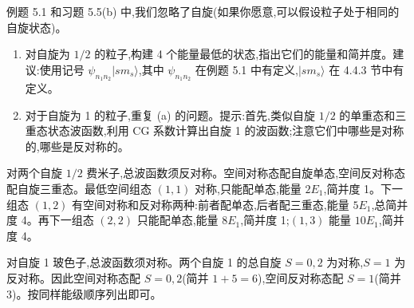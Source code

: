 \begin{question}
例题 5.1 和习题 5.5(b) 中,我们忽略了自旋(如果你愿意,可以假设粒子处于相同的自旋状态)。
\begin{enumerate}
\item 对自旋为 $1/2$ 的粒子,构建 4 个能量最低的状态,指出它们的能量和简并度。建议:使用记号 $\psi_{n_1n_2}|s m_s\rangle$,其中 $\psi_{n_1n_2}$ 在例题 5.1 中有定义,$|s m_s\rangle$ 在 4.4.3 节中有定义。
\item 对于自旋为 1 的粒子,重复 (a) 的问题。提示:首先,类似自旋 $1/2$ 的单重态和三重态状态波函数,利用 CG 系数计算出自旋 1 的波函数;注意它们中哪些是对称的,哪些是反对称的。
\end{enumerate}
\end{question}
\begin{solution}

对两个自旋 $1/2$ 费米子,总波函数须反对称。空间对称态配自旋单态,空间反对称态配自旋三重态。最低空间组态 $(1,1)$ 对称,只能配单态,能量 $2E_1$,简并度 1。下一组态 $(1,2)$ 有空间对称和反对称两种:前者配单态,后者配三重态,能量 $5E_1$,总简并度 4。再下一组态 $(2,2)$ 只能配单态,能量 $8E_1$,简并度 1;$(1,3)$ 能量 $10E_1$,简并度 4。

对自旋 1 玻色子,总波函数须对称。两个自旋 1 的总自旋 $S=0,2$ 为对称,$S=1$ 为反对称。因此空间对称态配 $S=0,2$(简并 $1+5=6$),空间反对称态配 $S=1$(简并 3)。按同样能级顺序列出即可。

\end{solution}

